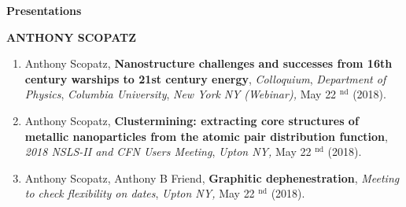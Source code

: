 \documentclass[prl,tighten,amsmath,amssymb,floatfix]{revtex4-1}
\begin{document}
\textbf{Presentations}

\textbf{ANTHONY SCOPATZ}
\vskip 12pt

\begin{enumerate}

\item Anthony Scopatz, {\bf Nanostructure challenges and successes from 16th century warships to 21st century energy},
{\it Colloquium},
{\it Department of Physics},
{\it Columbia University},
{\it New York}%
{\it NY}
{\it (Webinar)}{\it ,} { May }22%
$^\mathrm{ nd }$
(2018).

\item Anthony Scopatz, {\bf Clustermining: extracting core structures of metallic nanoparticles from the atomic pair distribution function},
{\it 2018 NSLS-II and CFN Users Meeting},
{\it Upton NY}{\it ,} { May }22%
$^\mathrm{ nd }$
(2018).

\item Anthony Scopatz, Anthony B Friend, {\bf Graphitic dephenestration},
{\it Meeting to check flexibility on dates},
{\it Upton NY}{\it ,} { May }22%
$^\mathrm{ nd }$
(2018).

\end{enumerate}
\end{document}
